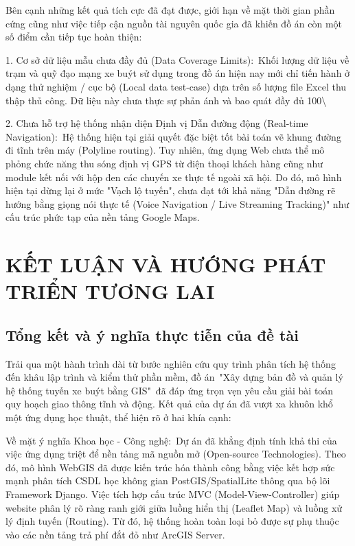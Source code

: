 \documentclass[13pt,a4paper]{report}
\begin{document}
Bên cạnh những kết quả tích cực đã đạt được, giới hạn về mặt thời gian phần cứng cũng như việc tiếp cận nguồn tài nguyên quốc gia đã khiến đồ án còn một số điểm cần tiếp tục hoàn thiện:

1. Cơ sở dữ liệu mẫu chưa đầy đủ (Data Coverage Limits): Khối lượng dữ liệu về trạm và quỹ đạo mạng xe buýt sử dụng trong đồ án hiện nay mới chỉ tiến hành ở dạng thử nghiệm / cục bộ (Local data test-case) dựa trên số lượng file Excel thu thập thủ công. Dữ liệu này chưa thực sự phản ánh và bao quát đầy đủ 100\textbackslash{}%

2. Chưa hỗ trợ hệ thống nhận diện Định vị Dẫn đường động (Real-time Navigation): Hệ thống hiện tại giải quyết đặc biệt tốt bài toán vẽ khung đường đi tĩnh trên máy (Polyline routing). Tuy nhiên, ứng dụng Web chưa thể mô phỏng chức năng thu sóng định vị GPS từ điện thoại khách hàng cũng như module kết nối với hộp đen các chuyến xe thực tế ngoài xã hội. Do đó, mô hình hiện tại dừng lại ở mức "Vạch lộ tuyến", chưa đạt tới khả năng "Dẫn đường rẽ hướng bằng giọng nói thực tế (Voice Navigation / Live Streaming Tracking)" như cấu trúc phức tạp của nền tảng Google Maps.

\chapter{KẾT LUẬN VÀ HƯỚNG PHÁT TRIỂN TƯƠNG LAI}

\section{Tổng kết và ý nghĩa thực tiễn của đề tài}

Trải qua một hành trình dài từ bước nghiên cứu quy trình phân tích hệ thống đến khâu lập trình và kiểm thử phần mềm, đồ án "Xây dựng bản đồ và quản lý hệ thống tuyến xe buýt bằng GIS" đã đáp ứng trọn vẹn yêu cầu giải bài toán quy hoạch giao thông tĩnh và động. Kết quả của dự án đã vượt xa khuôn khổ một ứng dụng học thuật, thể hiện rõ ở hai khía cạnh:

Về mặt ý nghĩa Khoa học - Công nghệ: Dự án đã khẳng định tính khả thi của việc ứng dụng triệt để nền tảng mã nguồn mở (Open-source Technologies). Theo đó, mô hình WebGIS đã được kiến trúc hóa thành công bằng việc kết hợp sức mạnh phân tích CSDL học không gian PostGIS/SpatialLite thông qua bộ lõi Framework Django. Việc tích hợp cấu trúc MVC (Model-View-Controller) giúp website phân lý rõ ràng ranh giới giữa luồng hiển thị (Leaflet Map) và luồng xử lý định tuyến (Routing). Từ đó, hệ thống hoàn toàn loại bỏ được sự phụ thuộc vào các nền tảng trả phí đắt đỏ như ArcGIS Server.
\end{document}
